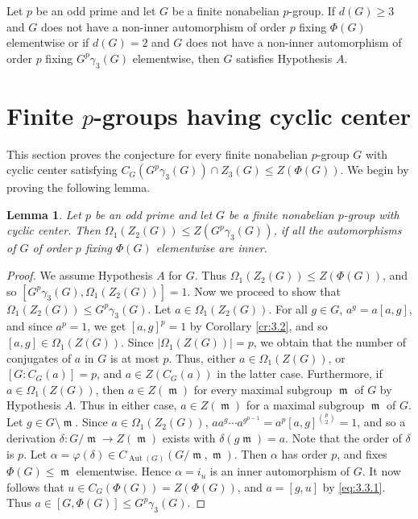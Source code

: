 \documentclass[preprint,sort&compress,12pt]{elsarticle}
\newtheorem{lemma}[theorem]{Lemma}
\theoremstyle{definition}
\numberwithin{equation}{theorem}
\DeclareMathOperator{\Aut}{\operatorname{Aut}}
\DeclareMathOperator{\m}{\mathfrak{m}}
\begin{document}
Let $p$ be an odd prime and let $G$ be a finite nonabelian $p$-group. If $d(G)\ge 3$ and $G$ does not have a non-inner automorphism of order $p$ fixing $\Phi(G)$ elementwise or if $d(G)=2$ and $G$ does not have a non-inner automorphism of order $p$ fixing $G^p\gamma_3(G)$ elementwise, then $G$ satisfies Hypothesis $A$.

\section{Finite $p$-groups having cyclic center}
This section proves the conjecture for every finite nonabelian $p$-group $G$ with cyclic center satisfying $C_G(G^p\gamma_3(G))\cap Z_3(G)\le Z(\Phi(G))$. We begin by proving the following lemma.

\begin{lemma}\label{L:4.1}
Let $p$ be an odd prime and let $G$ be a finite nonabelian $p$-group with cyclic center. Then $\Omega_1(Z_2(G))\le Z(G^p\gamma_3(G))$, if all the automorphisms of $G$ of order $p$ fixing $\Phi(G)$ elementwise are inner. \end{lemma}

\begin{proof}
We assume Hypothesis $A$ for $G$. Thus $\Omega_1(Z_2(G))\le Z(\Phi(G))$, and so $[G^p\gamma_3(G), \Omega_1(Z_2(G))]=1$. Now we proceed to show that $\Omega_1(Z_2(G))\le G^p\gamma_3(G)$. Let $a\in \Omega_1(Z_2(G))$. For all $g\in G$, $a^g= a[a, g]$, and since $a^p=1$, we get $[a, g]^p=1$ by Corollary \ref{cr:3.2}, and so $[a, g]\in \Omega_1(Z(G))$. Since $|\Omega_1(Z(G))|=p$, we obtain that the number of conjugates of $a$ in $G$ is at most $p$. Thus, either $a\in \Omega_1(Z(G))$, or $[G:C_G(a)]=p$, and $a\in Z(C_G(a))$ in the latter case. Furthermore, if $a\in\Omega_1(Z(G))$, then $a\in Z(\m)$ for every maximal subgroup $\m$ of $G$ by Hypothesis $A$. Thus in either case, $a\in Z(\m)$ for a maximal subgroup $\m$ of $G$. Let $g\in G\setminus \m$. Since $a\in \Omega_1(Z_2(G))$, $aa^g\cdots a^{g^{p-1}}= a^p[a, g]^{{p}\choose{2}}=1$, and so a derivation $\delta:G/\m\rightarrow Z(\m)$ exists with $\delta(g\m)=a$. Note that the order of $\delta$ is $p$. Let $\alpha= \varphi(\delta)\in C_{\Aut(G)}(G/\m, \m)$. Then $\alpha$ has order $p$, and fixes $\Phi(G)\le \m$ elementwise. Hence $\alpha=i_u$ is an inner automorphism of $G$. It now follows that $u\in C_G(\Phi(G))=Z(\Phi(G))$, and $a=[g, u]$ by \eqref{eq:3.3.1}. Thus $a\in [G, \Phi(G)]\le G^p\gamma_3(G)$.
\end{proof}
\end{document}
